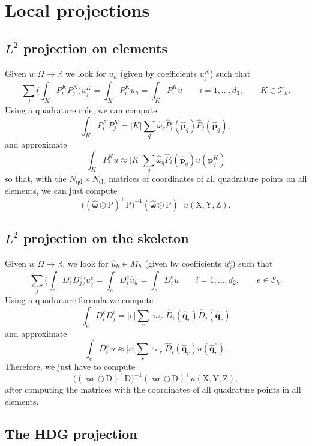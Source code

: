 \documentclass[10pt,english]{article}
\newcommand{\Nelt}{{N_{\mathrm{elt}}}}
\newcommand{\Nnd}{{N_{\mathrm{qd}}}}
\newcommand{\pp}{\widehat{\mathbf p}}
\newcommand{\qq}{\widehat{\mathbf q}}
\begin{document}
\section{Local projections}

\subsection{$L^2$ projection on elements}

Given $u:\Omega\to\mathbb R$ we look for $u_h$ (given by coefficients $u_j^K$) such that
\[
\sum_j \Big( \int_K P_i^K P_j^K\Big) u_j^K =\int_K P_i^K u_h = \int_K P_i^K u\qquad i=1,\ldots,d_3, \qquad K \in \mathcal T_h.
\]
Using a quadrature rule, we can compute
\[
\int_K P_i^K P_j^K =|K| \sum_q \widehat\omega_q \widehat P_i(\pp_q)\widehat P_j(\pp_q),
\]
and approximate
\[
\int_K P_i^K u\approx |K| \sum_q\widehat\omega_q \widehat P_i(\widehat{\mathbf p}_q) u(\mathbf p_q^K)
\]
so that, with the $\Nnd\times \Nelt$ matrices of coordinates of all quadrature points on all elements, we can just compute
\[
\big((\widehat{\boldsymbol\omega}\odot\mathrm P)^\top\mathrm P)^{-1} (\widehat{\boldsymbol\omega}\odot\mathrm P)^\top u(\mathrm X,\mathrm Y,\mathrm Z).
\]




\subsection{$L^2$ projection on the skeleton}

Given $u:\Omega\to\mathbb R$, we look for $\widehat u_h \in M_h$ (given by coefficients $u_j^e$) such that
\[
\sum_j \Big(\int_e D_i^e D_j^e\Big) u_j^e =\int_e D_i^e \widehat u_h=\int_e D_i^e u \qquad i=1,\ldots,d_2, \qquad e \in \mathcal E_h.
\]
Using a quadrature formula we compute
\[
\int_e D_i^e D_j^e =|e| \sum_r \varpi_r \widehat D_i(\qq_r)\widehat D_j(\qq_r)
\]
and approximate
\[
\int_e D_i^e \,u \approx |e| \sum_r \varpi_r \widehat D_i(\qq_r) u(\qq_r^e).
\]
Therefore, we just have to compute
\[
\big((\boldsymbol\varpi\odot\mathrm D)^\top\mathrm D)^{-1} (\boldsymbol\varpi\odot\mathrm D)^\top u(\mathrm X,\mathrm Y,\mathrm Z),
\]
after computing the matrices with the coordinates of all quadrature points in all elements.




\subsection{The HDG projection}
\end{document}
